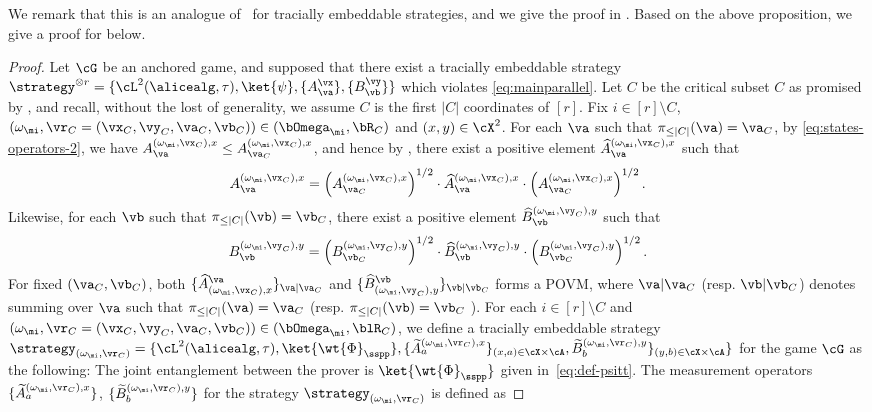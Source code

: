 We remark that this is an analogue of~\cite[Proposition 5.1]{bavarianAnchoredParallelRepetition2021} for tracially embeddable strategies, and we give the proof in . Based on the above proposition, we give a proof for  below.
\begin{proof}
	Let $\cG$ be an anchored game, and supposed that there exist a tracially embeddable strategy$\strategy^{\otimes r} = \{ \cL^2(\alicealg, \tau),\ket{\psi}, \{A^\vx_\va \}, \{B^\vy_\vb \} \}$ which violates \eqref{eq:mainparallel}. Let $C$ be the critical subset $C$ as promised by , and recall, without the lost of generality, we assume $C$ is the first $|C|$ coordinates of $[r]$. Fix  $i \in [r] \setminus C$, $(\omega_\mi,\vr_C = (\vx_C, \vy_C, \va_C, \vb_C)) \in (\bOmega_\mi, \bR_C)$ and $(x,y) \in \cX^2$. For each $\va$ such that $\pi_{\leq |C|} (\va) =\va_C$, by \eqref{eq:states-operators-2}, we have $A^{(\omega_{\mi}, \vx_C),x}_\va \leq A^{(\omega_{\mi}, \vx_C),x}_{\va_C}$, and hence by , there exist a positive element $\widehat{A}^{(\omega_{\mi}, \vx_C),x}_{\va}$ such that
	\begin{equation*}
		A^{(\omega_{\mi}, \vx_C),x}_\va  = \left(A^{(\omega_{\mi}, \vx_C),x}_{\va_C}\right)^{1/2} \cdot \widehat{A}^{(\omega_{\mi}, \vx_C),x}_\va \cdot \left(A^{(\omega_{\mi}, \vx_C),x}_{\va_C}\right)^{1/2}.
	\end{equation*}
	Likewise, for each $\vb$ such that $\pi_{\leq |C|} (\vb) =\vb_C$, there exist a positive element $\widehat{B}^{(\omega_{\mi}, \vy_C),y}_\vb$ such that 
	\begin{equation*}
		B^{(\omega_{\mi}, \vy_C),y}_\vb  = \left(B^{(\omega_{\mi}, \vy_C),y}_{\vb_C}\right)^{1/2} \cdot \widehat{B}^{(\omega_{\mi}, \vy_C),y}_\vb \cdot\left(B^{(\omega_{\mi}, \vy_C),y}_{\vb_C}\right)^{1/2} .
	\end{equation*}
	 For fixed $(\va_C, \vb_C)$, both $\{\widehat{A}_{(\omega_{\mi}, \vx_C),x}^\va \}_{\va| \va_C}$ and $\{ \widehat{B}_{(\omega_{\mi}, \vy_C),y}^\vb \}_{\vb| \vb_C}$ forms a POVM, where $\va| \va_C$ (resp. $\vb| \vb_C$) denotes summing over $\va$ such that $\pi_{\leq |C|} (\va) =\va_C$  (resp. $\pi_{\leq |C|} (\vb) =\vb_C$ ). For each $i \in [r] \setminus C$ and $(\omega_\mi,\vr_C = (\vx_C, \vy_C, \va_C, \vb_C)) \in (\bOmega_\mi, \blR_C)$, we define a tracially embeddable strategy $\strategy_{(\omega_\mi,\vr_C)} = \{ \cL^2(\alicealg, \tau),\ket{\wt{\Phi}_\sspp},\{\widetilde{A}^{(\omega_\mi,\vr_C),x}_a\}_{(x,a) \in \cX\times \cA} , \widetilde{B}^{(\omega_\mi,\vr_C),y}_b\}_{(y,b) \in \cX \times \cA} \}$ for the game $\cG$ as the following: The joint entanglement between the prover is $\ket{\wt{\Phi}_\sspp}$ given in~\eqref{eq:def-psitt}. The measurement operators $\{\widetilde{A}^{(\omega_\mi,\vr_C),x}_a  \}$, $\{	\widetilde{B}^{(\omega_\mi,\vr_C),y}_b \}$ for the strategy $\strategy_{(\omega_\mi,\vr_C)}$ is defined as

\end{proof}
